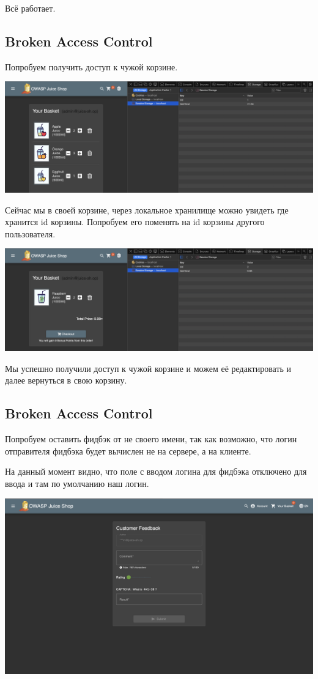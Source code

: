 \documentclass{article}
\begin{document}
Всё работает.

\subsection{Broken Access Control}

Попробуем получить доступ к чужой корзине.
\begin{center}
  \includegraphics[width=.9\textwidth]{q1}
\end{center}

Сейчас мы в своей корзине, через локальное хранилище можно увидеть где хранится id корзины.
Попробуем его поменять на id корзины другого пользователя.

\begin{center}
  \includegraphics[width=.9\textwidth]{q11}
\end{center}

Мы успешно получили доступ к чужой корзине и можем её редактировать и далее вернуться в свою корзину.

\subsection{Broken Access Control}

Попробуем оставить фидбэк от не своего имени, так как возможно, что логин отправителя фидбэка будет вычислен не на сервере, а на клиенте.

На данный момент видно, что поле с вводом логина для фидбэка отключено для ввода и там по умолчанию наш логин.

\begin{center}
  \includegraphics[width=.9\textwidth]{s1}
\end{center}
\end{document}
